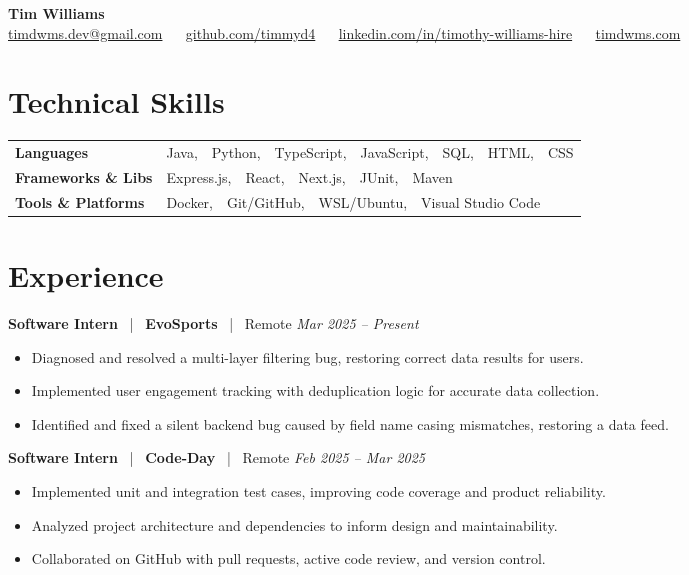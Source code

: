 \documentclass[10pt, letterpaper]{article}
\newcommand{\jobhead}[4]{%
  \vspace{5pt}%
  {\bfseries\color{dark}#1}%
  ~{\color{light}|}~%
  {\bfseries\color{navy}#2}%
  ~{\color{light}|}~%
  {\color{light}#3}%
  \hfill{\color{light}\small\textit{#4}}\\[-2pt]%
}
\newcommand{\skillrow}[2]{%
  {\bfseries #1} & #2 \\[2pt]%
}
\begin{document}

\begin{center}
  {\huge\bfseries\color{navy} Tim Williams}\\[4pt]
  {\small\color{light}
    \href{mailto:timdwms.dev@gmail.com}{timdwms.dev@gmail.com}
    ~\textbullet~
    \href{https://github.com/timmyd4}{github.com/timmyd4}
    ~\textbullet~
    \href{https://www.linkedin.com/in/timothy-williams-hire}{linkedin.com/in/timothy-williams-hire}
    ~\textbullet~
    \href{https://timdwms.com}{timdwms.com}
  }
\end{center}

\vspace{2pt}

\section{Technical Skills}

\begin{tabular}{@{}p{1.6in} p{5.2in}@{}}
  \skillrow{Languages}{Java,\ \ Python,\ \ TypeScript,\ \ JavaScript,\ \ SQL,\ \ HTML,\ \ CSS}
  \skillrow{Frameworks \& Libs}{Express.js,\ \ React,\ \ Next.js,\ \ JUnit,\ \ Maven}
  \skillrow{Tools \& Platforms}{Docker,\ \ Git/GitHub,\ \ WSL/Ubuntu,\ \ Visual Studio Code}
\end{tabular}

\section{Experience}

\jobhead{Software Intern}{EvoSports}{Remote}{Mar 2025 – Present}
\begin{itemize}
  \item Diagnosed and resolved a multi-layer filtering bug, restoring correct data results for users.
  \item Implemented user engagement tracking with deduplication logic for accurate data collection.
  \item Identified and fixed a silent backend bug caused by field name casing mismatches, restoring a data feed.
\end{itemize}

\jobhead{Software Intern}{Code-Day}{Remote}{Feb 2025 – Mar 2025}
\begin{itemize}
  \item Implemented unit and integration test cases, improving code coverage and product reliability.
  \item Analyzed project architecture and dependencies to inform design and maintainability.
  \item Collaborated on GitHub with pull requests, active code review, and version control.
\end{itemize}
\end{document}
